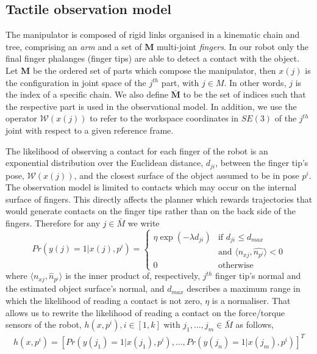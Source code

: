 \subsection{Tactile observation model}\label{sec:ch06:observational_model}

The manipulator is composed of rigid links organised in a kinematic chain and tree, comprising an {\em arm} and a set of $\mathbf{M}$ multi-joint {\em fingers}. In our robot only the final finger phalanges (finger tips) are able to detect a contact with the object. Let $\mathbf{M}$ be the ordered set of parts which compose the manipulator, then $x(j)$ is the configuration in joint space of the $j^{th}$ part, with $j\in M$. In other words, $j$ is the index of a specific chain. We also define $\bar{\mathbf{M}}$ to be the set of indices such that the respective part is used in the observational model. In addition, we use the operator $\mathcal{W}(x(j))$ to refer to the workspace coordinates in $SE(3)$ of the $j^{th}$ joint with respect to a given reference frame.  

The likelihood of observing a contact for each finger of the robot is an exponential distribution over the Euclidean distance, $d_{ji}$, between the finger tip's pose, $\mathcal{W}(x(j))$, and the closest surface of the object assumed to be in pose $p^i$. The observation model is limited to contacts which may occur on the internal surface of fingers. This directly affects the planner which rewards trajectories that would generate contacts on the finger tips rather than on the back side of the fingers. Therefore for any $j\in\bar{M}$ we write
$$
Pr(y(j)=1|x(j), p^i)=
\begin{cases}
  \eta\exp(-\lambda d_{ji}) & \text{if }d_{ji}\leq d_{max} \\
	& \text{and }\langle n_{xj},\hat{n_{p^i}}\rangle < 0 \\
  0 & \text{otherwise}
\end{cases}
$$
where $\langle n_{xj},\hat{n}_{p^i}\rangle$ is the inner product of, respectively, $j^{th}$ finger tip's normal and the estimated object surface's normal, and $d_{max}$ describes a maximum range in which the likelihood of reading a contact is not zero, $\eta$ is a normaliser. That allows us to rewrite the likelihood of reading a contact on the force/torque sensors of the robot, $h(x,p^i),i\in[1,k]$ with $j_1,\ldots,j_m\in\bar{M}$ as follows,
$$
\begin{aligned}
h(x,p^i)=[Pr(y(j_1)=1|x(j_1),p^i),\dots,Pr(y(j_n)=1|x(j_m),p^i)]^T
\end{aligned}
$$


